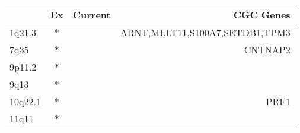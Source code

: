 \begin{tabular}{lccr}
\toprule
{} & Ex & Current &                       CGC Genes \\
\midrule
1q21.3  &  * &         &  ARNT,MLLT11,S100A7,SETDB1,TPM3 \\
7q35    &  * &         &                         CNTNAP2 \\
9p11.2  &  * &         &                                 \\
9q13    &  * &         &                                 \\
10q22.1 &  * &         &                            PRF1 \\
11q11   &  * &         &                                 \\
\bottomrule
\end{tabular}
